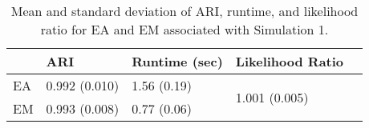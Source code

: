 \documentclass[12pt]{report}
\begin{document}
\begin{table}[!htbp]
  \caption{Mean and standard deviation of ARI, runtime, and likelihood ratio for EA and EM associated with Simulation 1.}
\vspace{0.5cm}
  \begin{tabularx}{\textwidth}{l *{3}{X}c}
  \toprule
    &\textbf{ARI}& \textbf{Runtime (sec)}  & \textbf{Likelihood Ratio} \\
  \midrule
  EA & 0.992 (0.010)     & 1.56 (0.19) & \multirow{2}{*}{1.001 (0.005)}  \\
  EM & 0.993 (0.008)    & 0.77 (0.06)   \\
  \bottomrule
  \end{tabularx}
\end{table}




\end{document}
